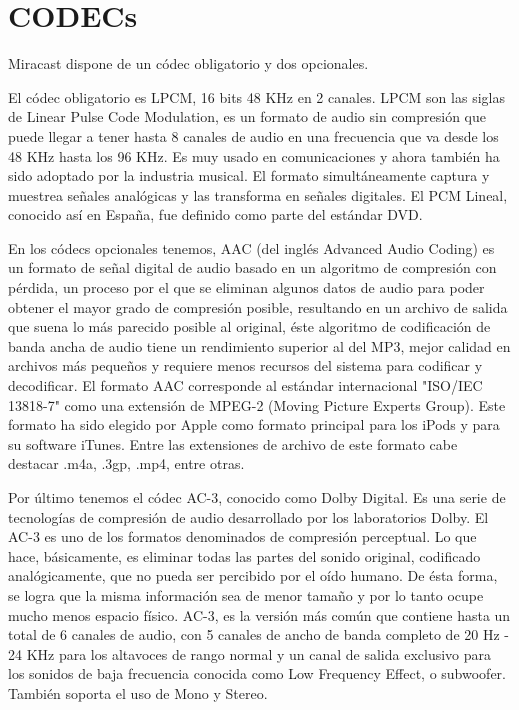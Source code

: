 \section{CODECs}

Miracast dispone de un códec obligatorio y dos opcionales.

El códec obligatorio es LPCM, 16 bits 48 KHz en 2 canales. LPCM son las siglas de Linear Pulse Code Modulation, es un formato de audio sin compresión que puede llegar a tener hasta 8 canales de audio en una frecuencia que va desde los 48 KHz hasta los 96 KHz. Es muy usado en comunicaciones y ahora también ha sido adoptado por la industria musical. El formato simultáneamente captura y muestrea señales analógicas y las transforma en señales digitales. El PCM Lineal, conocido así en España, fue definido como parte del estándar DVD.

En los códecs opcionales tenemos, AAC (del inglés Advanced Audio Coding) es un formato de señal digital de audio basado en un algoritmo de compresión con pérdida, un proceso por el que se eliminan algunos datos de audio para poder obtener el mayor grado de compresión posible, resultando en un archivo de salida que suena lo más parecido posible al original, éste algoritmo de codificación de banda ancha de audio tiene un rendimiento superior al del MP3, mejor calidad en archivos más pequeños y requiere menos recursos del sistema para codificar y decodificar. El formato AAC corresponde al estándar internacional "ISO/IEC 13818-7" como una extensión de MPEG-2 (Moving Picture Experts Group). Este formato ha sido elegido por Apple como formato principal para los iPods y para su software iTunes. Entre las extensiones de archivo de este formato cabe destacar .m4a, .3gp, .mp4, entre otras.

Por último tenemos el códec AC-3, conocido como Dolby Digital. Es una serie de tecnologías de compresión de audio desarrollado por los laboratorios Dolby. El AC-3 es uno de los formatos denominados de compresión perceptual. Lo que hace, básicamente, es eliminar todas las partes del sonido original, codificado analógicamente, que no pueda ser percibido por el oído humano. De ésta forma, se logra que la misma información sea de menor tamaño y por lo tanto ocupe mucho menos espacio físico. AC-3, es la versión más común que contiene hasta un total de 6 canales de audio, con 5 canales de ancho de banda completo de 20 Hz - 24 KHz para los altavoces de rango normal y un canal de salida exclusivo para los sonidos de baja frecuencia conocida como Low Frequency Effect, o subwoofer. También soporta el uso de Mono y Stereo.
